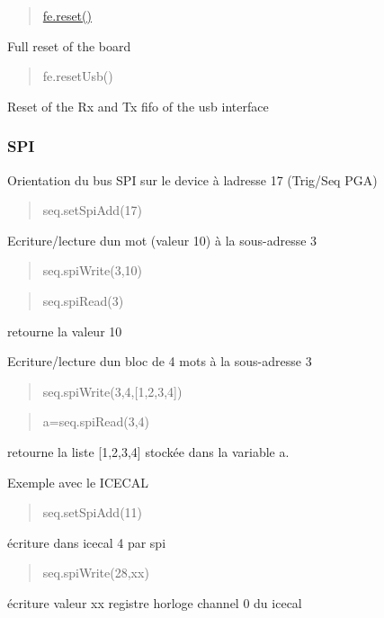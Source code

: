 \begin{quote}
\hyperlink{namespaceshell_a2f31bbe4baf894f4863c4d392239ab8b}{fe.\+reset()} \end{quote}
Full reset of the board

\begin{quote}
fe.\+reset\+Usb() \end{quote}
Reset of the Rx and Tx fifo of the usb interface

\subsubsection*{S\+PI}

Orientation du bus S\+PI sur le device à l\textquotesingle{}adresse 17 (Trig/\+Seq P\+GA)

\begin{quote}
seq.\+set\+Spi\+Add(17) \end{quote}


Ecriture/lecture d\textquotesingle{}un mot (valeur 10) à la sous-\/adresse 3

\begin{quote}
seq.\+spi\+Write(3,10) \end{quote}


\begin{quote}
seq.\+spi\+Read(3) \end{quote}


retourne la valeur 10

Ecriture/lecture d\textquotesingle{}un bloc de 4 mots à la sous-\/adresse 3

\begin{quote}
seq.\+spi\+Write(3,4,\mbox{[}1,2,3,4\mbox{]}) \end{quote}


\begin{quote}
a=seq.\+spi\+Read(3,4) \end{quote}


retourne la liste \mbox{[}1,2,3,4\mbox{]} stockée dans la variable a.

Exemple avec le I\+C\+E\+C\+AL

\begin{quote}
seq.\+set\+Spi\+Add(11) \end{quote}
écriture dans icecal 4 par spi

\begin{quote}
seq.\+spi\+Write(28,xx) \end{quote}
écriture valeur xx registre horloge channel 0 du icecal

